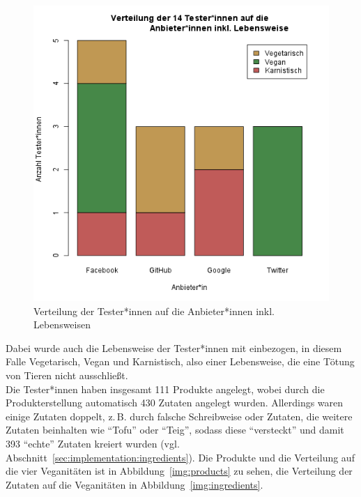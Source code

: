 \begin{figure}[ht]
  \centering
  \includegraphics[scale=0.6]{misc/r/users-p-v.png}
  \caption{Verteilung der Tester*innen auf die Anbieter*innen inkl. 
Lebensweisen}
  \label{img:users-p-v}
\end{figure}

Dabei wurde auch die Lebensweise der 
Tester*innen mit einbezogen, in diesem Falle Vegetarisch, Vegan und 
Karnistisch, also einer Lebensweise, die eine Tötung von Tieren nicht 
ausschließt.\\
Die Tester*innen haben insgesamt 111 Produkte angelegt, wobei durch die 
Produkterstellung automatisch 430 Zutaten angelegt wurden. Allerdings waren 
einige Zutaten doppelt, z.\,B. durch falsche Schreibweise oder Zutaten, die 
weitere Zutaten beinhalten wie "`Tofu"' oder "`Teig"', sodass diese 
"`versteckt"' und damit 393 "`echte"' Zutaten kreiert wurden (vgl. 
Abschnitt~\ref{sec:implementation:ingredients}).
Die Produkte und die Verteilung auf die vier Veganitäten ist in 
Abbildung~\ref{img:products} zu sehen, die Verteilung der Zutaten auf die 
Veganitäten in Abbildung~\ref{img:ingredients}.

